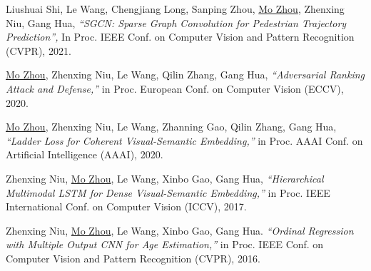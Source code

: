 \documentclass[10pt,margin,line,pifont,palatino,courier]{res}
\begin{document}
\begin{resume}
\begin{enumerate}[noitemsep, leftmargin=*, label={[C0{\arabic*}]}]
\item Liushuai Shi, Le Wang,
\reversemarginpar{}
Chengjiang Long, Sanping Zhou, \underline{Mo Zhou}, Zhenxing Niu, Gang Hua,
\textit{``SGCN: Sparse Graph Convolution for Pedestrian Trajectory Prediction'',}
In Proc. IEEE Conf. on Computer Vision and Pattern Recognition (CVPR), 2021.

\item \underline{Mo Zhou},
\reversemarginpar{}
Zhenxing Niu, Le Wang, Qilin Zhang, Gang Hua,
\textit{``Adversarial Ranking Attack and Defense,''}
in Proc. European Conf. on Computer Vision (ECCV), 2020.

\item  \underline{Mo Zhou},
\reversemarginpar{}
Zhenxing Niu, Le Wang, Zhanning Gao, Qilin Zhang, Gang Hua,
\textit{``Ladder Loss for Coherent Visual-Semantic Embedding,''}
in Proc. AAAI Conf. on Artificial Intelligence (AAAI), 2020.

\item Zhenxing Niu,
\reversemarginpar{}
\underline{Mo Zhou}, Le Wang, Xinbo Gao, Gang Hua,
\textit{``Hierarchical Multimodal LSTM for Dense Visual-Semantic Embedding,''}
in Proc. IEEE International Conf. on Computer Vision (ICCV), 2017.

\item Zhenxing Niu,
\reversemarginpar{}
\underline{Mo Zhou}, Le Wang, Xinbo Gao, Gang Hua.
\textit{``Ordinal Regression with Multiple Output CNN for Age Estimation,''}
in Proc. IEEE Conf. on Computer Vision and Pattern Recognition (CVPR), 2016.


\end{enumerate}
\end{resume}
\end{document}
